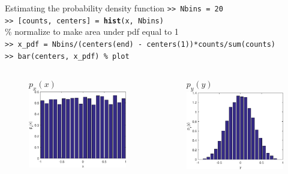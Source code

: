 \documentclass[10pt]{beamer}
\begin{document}
\begin{frame}{Estimating the probability density function}
\texttt{>> Nbins = 20} \\
\texttt{>> [counts, centers] = \textbf{hist}(x, Nbins)} \\
{\color{matlabcomment}\% normalize to make area under pdf equal to 1} \\
\texttt{>> x\_pdf = Nbins/(centers(end) - centers(1))*counts/sum(counts)} \\
\texttt{>> bar(centers, x\_pdf) {\color{matlabcomment}\% plot}}
\begin{columns}
	\begin{column}{0.5\textwidth}
			\begin{figure}
				\centering
				$p_x(x)$
				\includegraphics[width=\linewidth]{figs/lec2_random_experiment1_hist_x.eps}
			\end{figure}		
	\end{column}
	\begin{column}{0.5\textwidth}
	\begin{figure}
		\centering
		$p_y(y)$
		\includegraphics[width=\linewidth]{figs/lec2_random_experiment1_hist_y.eps}

\end{figure}
\end{column}
\end{columns}
\end{frame}
\end{document}
